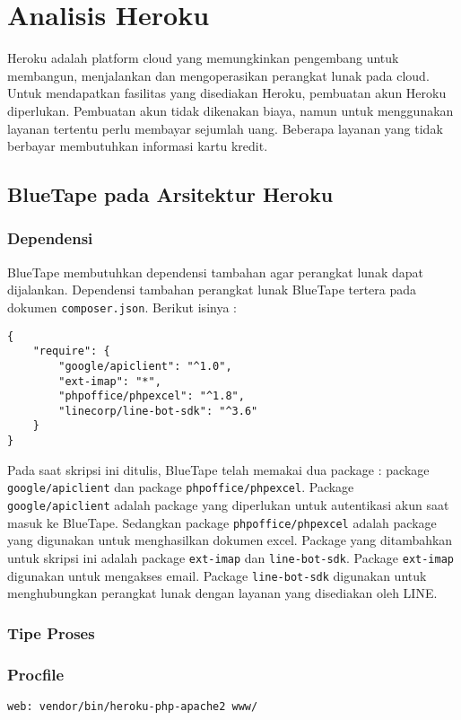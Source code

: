 \section{Analisis Heroku}
\label{sec:analisisheroku}
Heroku adalah platform cloud yang memungkinkan pengembang untuk membangun, menjalankan dan mengoperasikan perangkat lunak pada cloud. Untuk mendapatkan fasilitas yang disediakan Heroku, pembuatan akun Heroku diperlukan. Pembuatan akun tidak dikenakan biaya, namun untuk menggunakan layanan tertentu perlu membayar sejumlah uang. Beberapa layanan yang tidak berbayar membutuhkan informasi kartu kredit.


\subsection{BlueTape pada Arsitektur Heroku}
\subsubsection{Dependensi}
BlueTape membutuhkan dependensi tambahan agar perangkat lunak dapat dijalankan. Dependensi tambahan perangkat lunak BlueTape tertera pada dokumen \texttt{composer.json}. Berikut isinya :
\begin{lstlisting}
{
    "require": {
        "google/apiclient": "^1.0",
		"ext-imap": "*",
        "phpoffice/phpexcel": "^1.8",
        "linecorp/line-bot-sdk": "^3.6"
    }
}
\end{lstlisting}

Pada saat skripsi ini ditulis, BlueTape telah memakai dua package : package \texttt{google/apiclient} dan package \texttt{phpoffice/phpexcel}. Package \texttt{google/apiclient} adalah package yang diperlukan untuk autentikasi akun saat masuk ke BlueTape. Sedangkan package \texttt{phpoffice/phpexcel} adalah package yang digunakan untuk menghasilkan dokumen excel. Package yang ditambahkan untuk skripsi ini adalah package \texttt{ext-imap} dan \texttt{line-bot-sdk}. Package \texttt{ext-imap} digunakan untuk mengakses email. Package \texttt{line-bot-sdk} digunakan untuk menghubungkan perangkat lunak dengan layanan yang disediakan oleh LINE.

\subsubsection{Tipe Proses}


\subsubsection{Procfile}
\begin{lstlisting}
web: vendor/bin/heroku-php-apache2 www/
\end{lstlisting}

